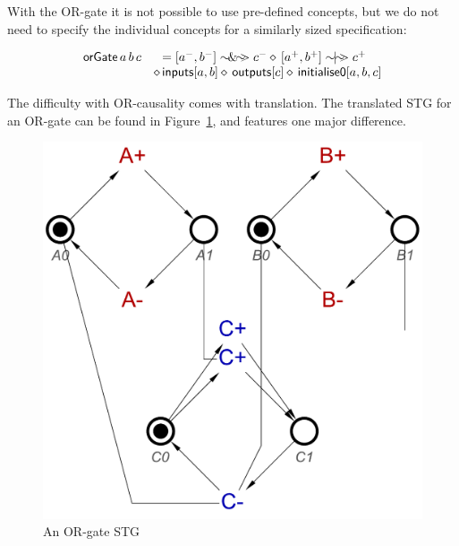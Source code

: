 \documentclass[british,conference,compsoc]{IEEEtran}
\begin{document}
\noindent With the OR-gate it is not possible to use pre-defined concepts, but we do not need to
specify the individual concepts for a similarly sized specification:

\[
\begin{array}{lcl}
\mathsf{orGate}\,a \,b \,c&\hspace{-2mm}=[a^{-}, b^{-}] \sim\hspace{-1.5mm}\&\hspace{-1.5mm}\sim\hspace{-1.5mm}> c^{-} \diamond\, [a^{+}, b^{+}] \sim\hspace{-1.5mm}|\hspace{-1.5mm}\sim\hspace{-1.5mm}> c^{+} \\
&\diamond\, \mathsf{inputs}[a, b] \diamond\, \mathsf{outputs}[c] \diamond\, \mathsf{initialise0} [a, b, c]
\end{array}
\]

\noindent The difficulty with OR-causality comes with translation. The translated STG for an OR-gate
can be found in Figure~\ref{fig:or-gate-stg}, and features one major difference.
\begin{figure}[h]
\begin{centering}
\includegraphics[scale=0.25]{Images/or-gate-stg}
\par\end{centering}
\protect\caption{\label{fig:or-gate-stg} An OR-gate STG}
\end{figure}
\end{document}
